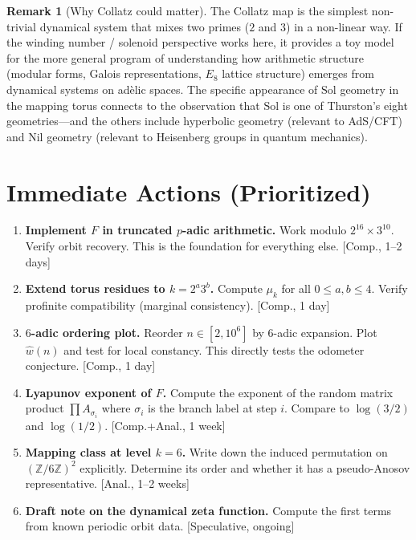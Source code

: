 \documentclass[11pt,a4paper]{article}
\newcommand{\Z}{\mathbb{Z}}
\newcommand{\Sol}{\mathrm{Sol}}
\theoremstyle{plain}
\theoremstyle{definition}
\newtheorem{remark}[theorem]{Remark}
\begin{document}
\begin{remark}[Why Collatz could matter]
    The Collatz map is the simplest non-trivial dynamical system that mixes two primes ($2$ and $3$) in a non-linear way. If the winding number / solenoid perspective works here, it provides a toy model for the more general program of understanding how arithmetic structure (modular forms, Galois representations, $E_8$ lattice structure) emerges from dynamical systems on ad\`elic spaces. The specific appearance of $\Sol$ geometry in the mapping torus connects to the observation that $\Sol$ is one of Thurston's eight geometries---and the others include hyperbolic geometry (relevant to AdS/CFT) and Nil geometry (relevant to Heisenberg groups in quantum mechanics).
\end{remark}

\section{Immediate Actions (Prioritized)}\label{sec:summary}

\begin{enumerate}
    \item \textbf{Implement $F$ in truncated $p$-adic arithmetic.} Work modulo $2^{16} \times 3^{10}$. Verify orbit recovery. This is the foundation for everything else. [Comp., 1--2 days]

    \item \textbf{Extend torus residues to $k = 2^a 3^b$.} Compute $\mu_k$ for all $0 \leq a, b \leq 4$. Verify profinite compatibility (marginal consistency). [Comp., 1 day]

    \item \textbf{$6$-adic ordering plot.} Reorder $n \in [2, 10^6]$ by $6$-adic expansion. Plot $\hat{w}(n)$ and test for local constancy. This directly tests the odometer conjecture. [Comp., 1 day]

    \item \textbf{Lyapunov exponent of $F$.} Compute the exponent of the random matrix product $\prod A_{\sigma_i}$ where $\sigma_i$ is the branch label at step $i$. Compare to $\log(3/2)$ and $\log(1/2)$. [Comp.+Anal., 1 week]

    \item \textbf{Mapping class at level $k = 6$.} Write down the induced permutation on $(\Z/6\Z)^2$ explicitly. Determine its order and whether it has a pseudo-Anosov representative. [Anal., 1--2 weeks]

    \item \textbf{Draft note on the dynamical zeta function.} Compute the first terms from known periodic orbit data. [Speculative, ongoing]
\end{enumerate}
\end{document}
